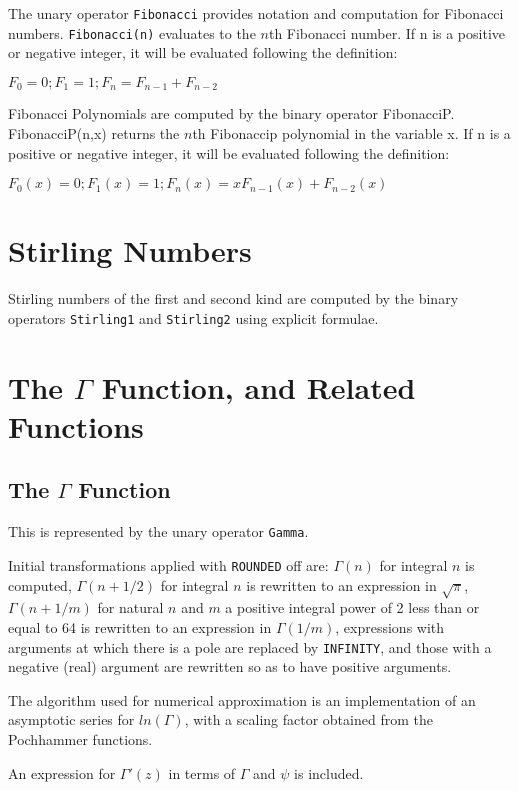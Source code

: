The unary operator {\tt Fibonacci} provides notation and computation for
Fibonacci numbers.  {\tt Fibonacci(n)} evaluates to the $n$th Fibonacci
number. If n is a positive or negative integer, it will be evaluated following
the definition:

$F_0 = 0 ; F_1 = 1 ; F_n = F_{n-1} + F_{n-2} $

Fibonacci Polynomials are computed by the binary operator 
FibonacciP. FibonacciP(n,x) returns the $n$th Fibonaccip polynomial
in the variable x. If n is a positive or negative integer, it will be evaluated following
the definition:

$F_0(x) = 0 ; F_1(x) = 1 ; F_n(x) = x F_{n-1}(x) + F_{n-2}(x) $


\section{Stirling Numbers}
Stirling numbers of the first and second kind are computed 
by the binary operators {\tt Stirling1} and {\tt Stirling2}
using explicit formulae.


\section{The $\Gamma$ Function, and Related Functions}

\subsection{The $\Gamma$ Function}

This is represented by the unary operator {\tt Gamma}.

Initial transformations applied with {\tt ROUNDED} off are: $\Gamma(n)$ for
integral $n$ is computed, $\Gamma(n+1/2)$ for integral $n$ is rewritten to
an expression in $\sqrt\pi$, $\Gamma(n+1/m)$ for natural $n$ and $m$ a
positive integral power of 2 less than or equal to 64 is rewritten to an
expression in $\Gamma(1/m)$, expressions with arguments at which there is a
pole are replaced by {\tt INFINITY}, and those with a negative (real)
argument are rewritten so as to have positive arguments.

The algorithm used for numerical approximation is an implementation of an
asymptotic series for $ln(\Gamma)$, with a scaling factor obtained from
the Pochhammer functions.

An expression for $\Gamma'(z)$ in terms of $\Gamma$ and $\psi$ is
included.




